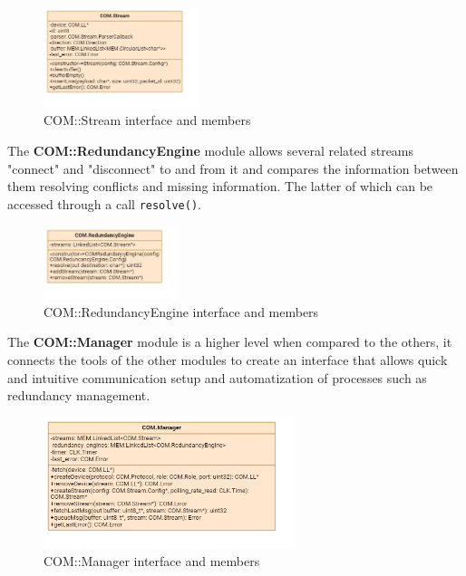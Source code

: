 \begin{figure}[H]
	\centering
	\includegraphics[width=0.4\textwidth]{./img/navig-class-stream.png}
	\caption {COM::Stream interface and members}
	\label{fig:navig-class-stream}
	\end{figure}


The \textbf{COM::RedundancyEngine} module allows several related streams "connect" and "disconnect" to and from it and compares the information between them resolving conflicts and missing information. The latter of which can be accessed through a call \texttt{resolve()}.

\begin{figure}[H]
	\centering
	\includegraphics[width=0.35\textwidth]{./img/navig-class-redundancy-engine.png}
	\caption {COM::RedundancyEngine interface and members}
	\label{fig:navig-class-redundancy-engine}
	\end{figure}


The \textbf{COM::Manager} module is a higher level when compared to the others, it connects the tools of the other modules to create an interface that allows quick and intuitive communication setup and automatization of processes such as redundancy management.
\begin{figure}[H]
	\centering
	\includegraphics[width=0.65\textwidth]{./img/navig-class-manager.png}
	\caption {COM::Manager interface and members}
	\label{fig:navig-class-manager}
	\end{figure}



